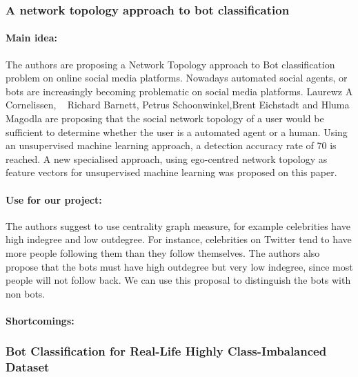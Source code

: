 \subsubsection{A network topology approach to bot classification}

\paragraph{Main idea:}
The authors are proposing a Network Topology approach to Bot classification problem on online social media platforms. Nowadays automated social agents, or bots are increasingly becoming problematic on social media platforms. Laurewz A Cornelissen, ~\cite{cornelissen2018network} Richard Barnett, Petrus Schoonwinkel,Brent Eichstadt and Hluma Magodla are proposing that the social network topology of a user would be sufficient to determine whether the user is a automated agent or a human. Using an unsupervised machine learning approach, a detection accuracy rate of 70\text{\%} is reached.
A new specialised approach, using ego-centred network topology as feature vectors for unsupervised machine learning was proposed on this paper. 
\cite{cornelissen2018network}

\paragraph{Use for our project:}
The authors suggest to use centrality graph measure, for example celebrities have high indegree and low outdegree. For instance, celebrities on Twitter tend to have more people following them than they follow themselves. The authors also propose that the bots must have high outdegree but very low indegree, since most people will not follow back. We can use this proposal to distinguish the bots with non bots. ~\cite{cornelissen2018network} 
\paragraph{Shortcomings:}




\subsubsection{Bot Classification for Real-Life Highly Class-Imbalanced Dataset}

